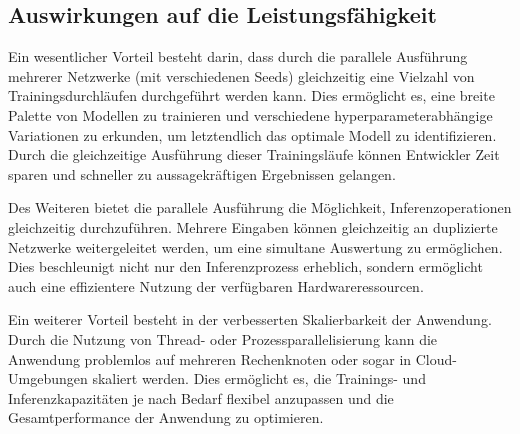 \subsection{Auswirkungen auf die Leistungsfähigkeit}
\label{sec:Grundlagen_Parallelisierung_Leistungsfähigkeit}
Ein wesentlicher Vorteil besteht darin, dass durch die parallele Ausführung mehrerer Netzwerke (mit verschiedenen Seeds) gleichzeitig eine Vielzahl von Trainingsdurchläufen durchgeführt werden kann. Dies ermöglicht es, eine breite Palette von Modellen zu trainieren und verschiedene hyperparameterabhängige Variationen zu erkunden, um letztendlich das optimale Modell zu identifizieren. Durch die gleichzeitige Ausführung dieser Trainingsläufe können Entwickler Zeit sparen und schneller zu aussagekräftigen Ergebnissen gelangen.

Des Weiteren bietet die parallele Ausführung die Möglichkeit, Inferenzoperationen gleichzeitig durchzuführen. Mehrere Eingaben können gleichzeitig an duplizierte Netzwerke weitergeleitet werden, um eine simultane Auswertung zu ermöglichen. Dies beschleunigt nicht nur den Inferenzprozess erheblich, sondern ermöglicht auch eine effizientere Nutzung der verfügbaren Hardwareressourcen.

Ein weiterer Vorteil besteht in der verbesserten Skalierbarkeit der Anwendung. Durch die Nutzung von Thread- oder Prozessparallelisierung kann die Anwendung problemlos auf mehreren Rechenknoten oder sogar in Cloud-Umgebungen skaliert werden. Dies ermöglicht es, die Trainings- und Inferenzkapazitäten je nach Bedarf flexibel anzupassen und die Gesamtperformance der Anwendung zu optimieren.
